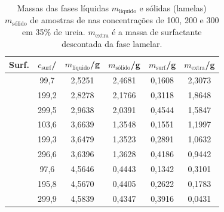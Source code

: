	\begin{table}[h]
		\IBGEtab%
		{
			\caption{Massas das fases líquidas \(m_{\text{líquido}}\) e sólidas (lamelas) \(m_{\text{sólido}}\) de amostras de \CTDTAB{} nas concentrações de 100, 200 e 300 \mM{} em 35\% de ureia. \(m_{\text{extra}}\) é a massa de surfactante descontada da fase lamelar.}
			
			\label{tab:SAXS_centrifug_ur35}
		}
		{
			\begin{tabular}{c c | c c c c}
				\toprule
				        Surf.          & \(c_{\text{surf}}\)/\mM & \(m_{\text{líquido}}\)/g & \(m_{\text{sólido}}\)/g & \(m_{\text{surf}}\)/g & \(m_{\text{extra}}\)/g \\ \midrule
				\multirow{3}{*}{\CTAB} & 99,7                    & 2,5251                   & 2,4681                  & 0,1608                & 2,3073                 \\
				                       & 199,2                   & 2,8278                   & 2,1766                  & 0,3118                & 1,8648                 \\
				                       & 299,5                   & 2,9638                   & 2,0391                  & 0,4544                & 1,5847                 \\ \midrule
				\multirow{3}{*}{\TTAB} & 103,6                   & 3,6639                   & 1,3548                  & 0,1551                & 1,1997                 \\
				                       & 199,3                   & 3,6479                   & 1,3523                  & 0,2891                & 1,0632                 \\
				                       & 296,6                   & 3,6396                   & 1,3628                  & 0,4186                & 0,9442                 \\ \midrule
				\multirow{3}{*}{\DTAB} & 97,6                    & 4,5646                   & 0,4443                  & 0,1342                & 0,3101                 \\
				                       & 195,8                   & 4,5670                   & 0,4405                  & 0,2622                & 0,1783                 \\
				                       & 299,9                   & 4,5839                   & 0,4347                  & 0,3916                & 0,0431                 \\ \bottomrule
			\end{tabular}
		}
		{}
	\end{table}
	
